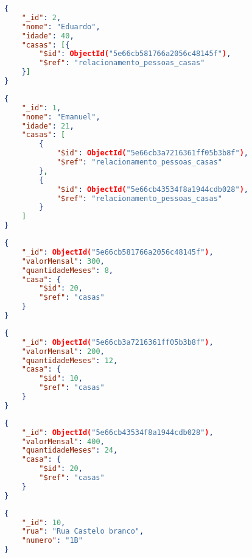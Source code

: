 \begin{lstlisting}[language=json, caption={Documento de \textit{Eduardo} Usando Documento Auxiliar\label{lst: doc-dbref-auxiliar-eduardo}}]
{
    "_id": 2,
    "nome": "Eduardo",
    "idade": 40,
    "casas": [{
        "$id": ObjectId("5e66cb581766a2056c48145f"),
        "$ref": "relacionamento_pessoas_casas"
    }]
}
\end{lstlisting}

\begin{lstlisting}[language=json, caption={Documento de \textit{Emanuel} Usando Documento Auxiliar\label{lst: doc-dbref-auxiliar-emanuel}}]
{
    "_id": 1,
    "nome": "Emanuel",
    "idade": 21,
    "casas": [
        {
            "$id": ObjectId("5e66cb3a7216361ff05b3b8f"),
            "$ref": "relacionamento_pessoas_casas"
        },
        {
            "$id": ObjectId("5e66cb43534f8a1944cdb028"),
            "$ref": "relacionamento_pessoas_casas"
        }
    ]
}
\end{lstlisting}


\begin{lstlisting}[language=json, caption={Relacionamento de \textit{Eduardo} com sua Casa \label{lst: doc-dbref-auxiliar-relacionamento-eduardo}}]
{
    "_id": ObjectId("5e66cb581766a2056c48145f"),
    "valorMensal": 300,
    "quantidadeMeses": 8,
    "casa": {
        "$id": 20,
        "$ref": "casas"
    }
}
\end{lstlisting}

\begin{lstlisting}[language=json, caption={Relacionamento de \textit{Emanuel} Com Sua Primeira Casa \label{lst: doc-dbref-auxiliar-relacionamento1-emanuel}}]
{
    "_id": ObjectId("5e66cb3a7216361ff05b3b8f"),
    "valorMensal": 200,
    "quantidadeMeses": 12,
    "casa": {
        "$id": 10,
        "$ref": "casas"
    }
}
\end{lstlisting}

\begin{lstlisting}[language=json, caption={Relacionamento de \textit{Emanuel} Com Sua Segunda Casa\label{lst: doc-dbref-auxiliar-relacionamento2-emanuel}}]
{
    "_id": ObjectId("5e66cb43534f8a1944cdb028"),
    "valorMensal": 400,
    "quantidadeMeses": 24,
    "casa": {
        "$id": 20,
        "$ref": "casas"
    }
}
\end{lstlisting}


\begin{lstlisting}[language=json, caption={Documento da Casa de Número 1B\label{lst: doc-dbref-auxiliar-casa-1b}}]
{
    "_id": 10,
    "rua": "Rua Castelo branco",
    "numero": "1B"
}
\end{lstlisting}

